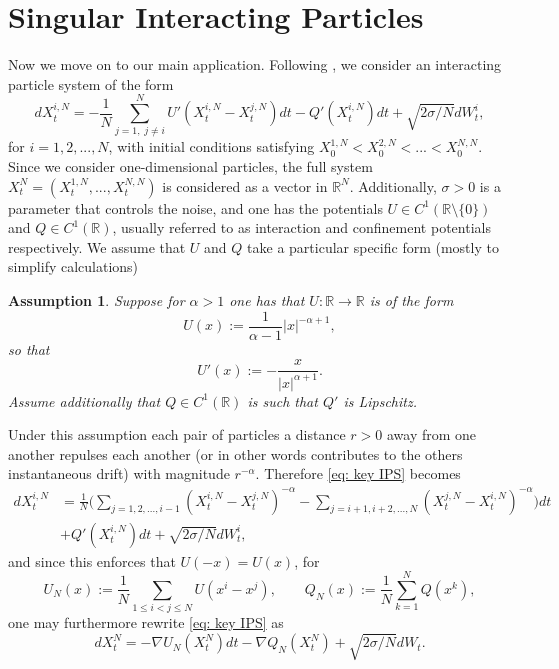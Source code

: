 \documentclass{article}
\newtheorem{assmp}{Assumption}
\begin{document}
\section{Singular Interacting Particles}\label{sec: singular ips}
Now we move on to our main application. Following \cite{Guillin2022OnSO}, we consider an interacting particle system of the form
\begin{equation}\label{eq: key IPS}
    dX^{i,N}_t=-\frac{1}{N}\sum_{j=1, \; j\not=i}^N U'(X^{i,N}_t-X^{j,N}_t)dt-Q'(X^{i,N}_t)dt+\sqrt{2\sigma/N}dW^i_t,
\end{equation}
for $i=1,2,...,N$, with initial conditions satisfying $X^{1,N}_0<X^{2,N}_0<...<X^{N,N}_0$. Since we consider one-dimensional particles, the full system $X^N_t=(X^{1,N}_t,...,X^{N,N}_t)$ is considered as a vector in $\mathbb{R}^N$. Additionally, $\sigma>0$ is a parameter that controls the noise, and one has the potentials $U\in C^1(\mathbb{R}\setminus \{0\})$ and $Q\in C^1(\mathbb{R})$, usually referred to as interaction and confinement potentials respectively. We assume that $U$ and $Q$ take a particular specific form (mostly to simplify calculations)
\begin{assmp}\label{assmp: specific assmp}
    Suppose for $\alpha> 1$ one has that $U:\mathbb{R}\to\mathbb{R}$ is of the form
    \begin{equation}
U(x):=\frac{1}{\alpha-1}\lvert x\rvert ^{-\alpha+1},
    \end{equation}
    so that 
    \begin{equation}
        U'(x):=-\frac{x}{\lvert x \rvert^{\alpha+1}}.
    \end{equation}
    Assume additionally that $Q\in C^1(\mathbb{R})$ is such that $Q'$ is Lipschitz.
\end{assmp}
Under this assumption each pair of particles a distance $r>0$ away from one another repulses each another (or in other words contributes to the others instantaneous drift) with magnitude $r^{-\alpha}$. Therefore \eqref{eq: key IPS} becomes
\begin{align}\label{eq: key IPS 2}
    dX^{i,N}_t&=\frac{1}{N}\biggr ( \sum_{j=1,2,...,i-1}( X^{i,N}_t-X^{j,N}_t)^{-\alpha}-\sum_{j=i+1,i+2,...,N}( X^{j,N}_t-X^{i,N}_t)^{-\alpha}\biggr)dt\nonumber \\
    &+Q'(X^{i,N}_t)dt+\sqrt{2\sigma/N}dW^i_t,
\end{align}
and since this enforces that $U(-x)=U(x)$, for
\begin{equation}\label{eq: U_N defn}
    U_N(x):=\frac{1}{N}\sum_{1\leq i<j\leq N} U(x^i-x^j),\qquad Q_N(x):=\frac{1}{N}\sum_{k=1}^NQ(x^k),
\end{equation}
one may furthermore rewrite \eqref{eq: key IPS} as
\begin{equation}\label{eq: key IPS grad form}
    dX^N_t=-\nabla U_N(X^N_t)dt-\nabla Q_N(X^N_t)+\sqrt{2\sigma/N}dW_t.
\end{equation}
\end{document}
